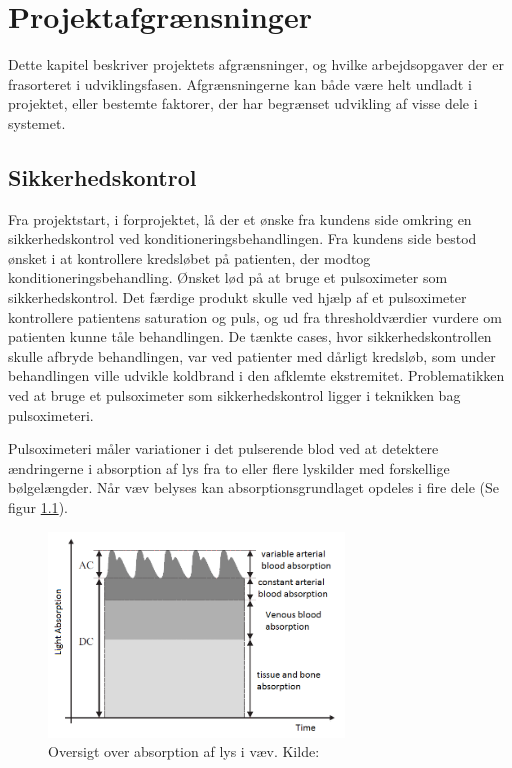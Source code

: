\chapter{Projektafgrænsninger}
Dette kapitel beskriver projektets afgrænsninger, og hvilke arbejdsopgaver der er frasorteret i udviklingsfasen. Afgrænsningerne kan både være helt undladt i projektet, eller bestemte faktorer, der har begrænset udvikling af visse dele i systemet. 

\section{Sikkerhedskontrol} \label{title:sikkerhedskontrol}
Fra projektstart, i forprojektet, lå der et ønske fra kundens side omkring en sikkerhedskontrol ved konditioneringsbehandlingen. Fra kundens side bestod ønsket i at kontrollere kredsløbet på patienten, der modtog konditioneringsbehandling. Ønsket lød på at bruge et pulsoximeter som sikkerhedskontrol. Det færdige produkt skulle ved hjælp af et pulsoximeter kontrollere patientens saturation og puls, og ud fra thresholdværdier vurdere om patienten kunne tåle behandlingen. De tænkte cases, hvor sikkerhedskontrollen skulle afbryde behandlingen, var ved patienter med dårligt kredsløb, som under behandlingen ville udvikle koldbrand i den afklemte ekstremitet. Problematikken ved at bruge et pulsoximeter som sikkerhedskontrol ligger i teknikken bag pulsoximeteri. 

Pulsoximeteri måler variationer i det pulserende blod ved at detektere ændringerne i absorption af lys fra to eller flere lyskilder med forskellige bølgelængder. Når væv belyses kan absorptionsgrundlaget opdeles i fire dele (Se figur \ref{fig:opticTissue}).
\begin{figure}[H]
	\centering
	\includegraphics[width = 0.7\textwidth]{billeder/opticTissue.png}
	\caption{Oversigt over absorption af lys i væv. Kilde: \cite{abdallah2011adaptive}}\label{fig:opticTissue}
\end{figure}

